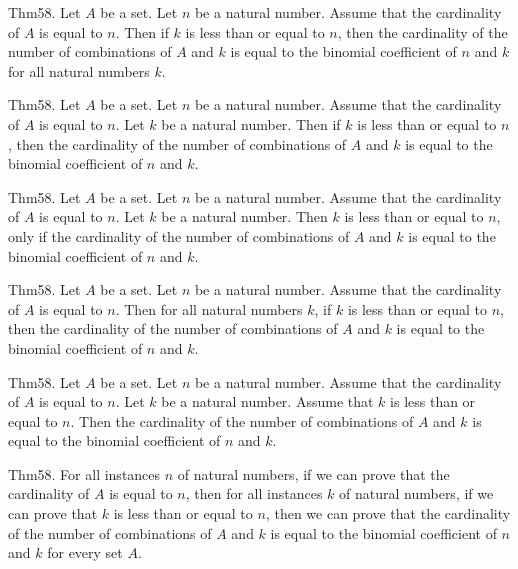 \documentclass{article}
\begin{document}
Thm58. Let $A$ be a set. Let $n$ be a natural number. Assume that the cardinality of $A$ is equal to $n$. Then if $k$ is less than or equal to $n$, then the cardinality of the number of combinations of $A$ and $k$ is equal to the binomial coefficient of $n$ and $k$ for all natural numbers $k$.

Thm58. Let $A$ be a set. Let $n$ be a natural number. Assume that the cardinality of $A$ is equal to $n$. Let $k$ be a natural number. Then if $k$ is less than or equal to $n$, then the cardinality of the number of combinations of $A$ and $k$ is equal to the binomial coefficient of $n$ and $k$.

Thm58. Let $A$ be a set. Let $n$ be a natural number. Assume that the cardinality of $A$ is equal to $n$. Let $k$ be a natural number. Then $k$ is less than or equal to $n$, only if the cardinality of the number of combinations of $A$ and $k$ is equal to the binomial coefficient of $n$ and $k$.

Thm58. Let $A$ be a set. Let $n$ be a natural number. Assume that the cardinality of $A$ is equal to $n$. Then for all natural numbers $k$, if $k$ is less than or equal to $n$, then the cardinality of the number of combinations of $A$ and $k$ is equal to the binomial coefficient of $n$ and $k$.

Thm58. Let $A$ be a set. Let $n$ be a natural number. Assume that the cardinality of $A$ is equal to $n$. Let $k$ be a natural number. Assume that $k$ is less than or equal to $n$. Then the cardinality of the number of combinations of $A$ and $k$ is equal to the binomial coefficient of $n$ and $k$.

Thm58. For all instances $n$ of natural numbers, if we can prove that the cardinality of $A$ is equal to $n$, then for all instances $k$ of natural numbers, if we can prove that $k$ is less than or equal to $n$, then we can prove that the cardinality of the number of combinations of $A$ and $k$ is equal to the binomial coefficient of $n$ and $k$ for every set $A$.
\end{document}

